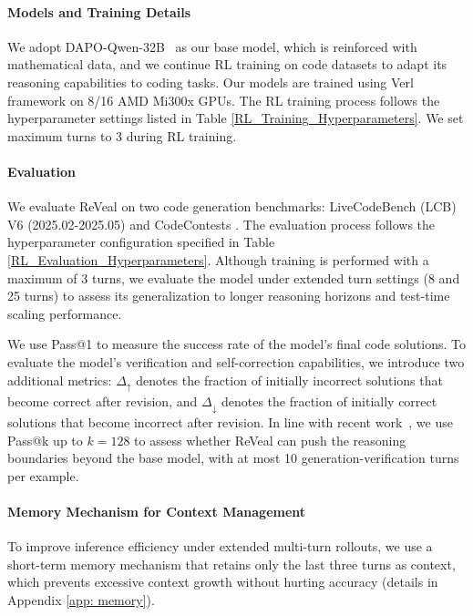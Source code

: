 \documentclass{article} %
\begin{document}
\paragraph{Models and Training Details}
We adopt DAPO-Qwen-32B~\citep{yu2025dapoopensourcellmreinforcement} as our base model, which is reinforced with mathematical data, and we continue RL training on code datasets to adapt its reasoning capabilities to coding tasks. Our models are trained using Verl~\citep{sheng2024hybridflow} framework on 8/16 AMD Mi300x GPUs. The RL training process follows the hyperparameter settings listed in Table \ref{RL_Training_Hyperparameters}. We set maximum turns to 3 during RL training.

\paragraph{Evaluation} We evaluate ReVeal on two code generation benchmarks: LiveCodeBench (LCB) V6 (2025.02-2025.05) \citep{jain2024livecodebenchholisticcontaminationfree} and CodeContests \citep{li2022competition}. The evaluation process follows the hyperparameter configuration specified in Table \ref{RL_Evaluation_Hyperparameters}. Although training is performed with a maximum of 3 turns, we evaluate the model under extended turn settings (8 and 25 turns) to assess its generalization to longer reasoning horizons and test-time scaling performance.

We use Pass@1 to measure the success rate of the model's final code solutions. To evaluate the model's verification and self-correction capabilities, we introduce two additional metrics: $\Delta_{\uparrow}$ denotes the fraction of initially incorrect solutions that become correct after revision, and $\Delta_{\downarrow}$ denotes the fraction of initially correct solutions that become incorrect after revision. In line with recent work~\citep{yue2025doesreinforcementlearningreally}, we use Pass@k up to \(k=128\) to assess whether ReVeal can push the reasoning boundaries beyond the base model, with at most 10 generation-verification turns per example.

\paragraph{Memory Mechanism for Context Management}
To improve inference efficiency under extended multi-turn rollouts, we use a short-term memory mechanism that retains only the last three turns as context, which prevents excessive context growth without hurting accuracy (details in Appendix \ref{app: memory}).
\end{document}
